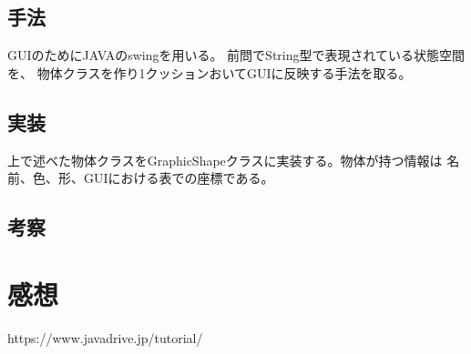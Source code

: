 \documentclass{jarticle}
\begin{document}
\subsection{手法}
    GUIのためにJAVAのswingを用いる。
    前問でString型で表現されている状態空間を、
    物体クラスを作り1クッションおいてGUIに反映する手法を取る。

\subsection{実装}
    上で述べた物体クラスをGraphicShapeクラスに実装する。物体が持つ情報は
    名前、色、形、GUIにおける表での座標である。
\subsection{考察}
    

\section{感想}

\begin{thebibliography}{99}
     https://www.javadrive.jp/tutorial/
\end{thebibliography}
\end{document}
